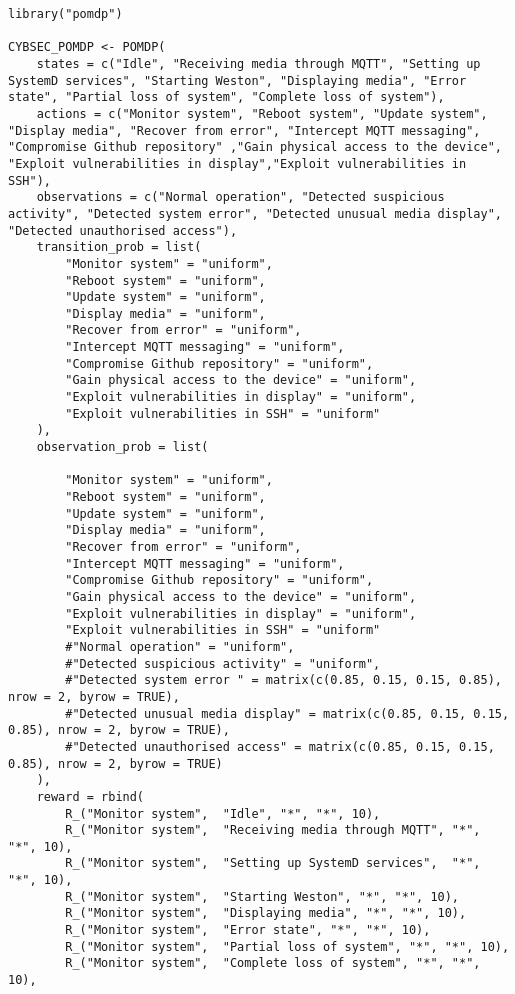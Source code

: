 \documentclass[language=english,version=final,mainfont=none,sharelatex=false]{utuftthesis}
\begin{document}
\begin{verbatim}
library("pomdp")

CYBSEC_POMDP <- POMDP(
    states = c("Idle", "Receiving media through MQTT", "Setting up SystemD services", "Starting Weston", "Displaying media", "Error state", "Partial loss of system", "Complete loss of system"),
    actions = c("Monitor system", "Reboot system", "Update system", "Display media", "Recover from error", "Intercept MQTT messaging", "Compromise Github repository" ,"Gain physical access to the device", "Exploit vulnerabilities in display","Exploit vulnerabilities in SSH"),
    observations = c("Normal operation", "Detected suspicious activity", "Detected system error", "Detected unusual media display", "Detected unauthorised access"),
    transition_prob = list(
        "Monitor system" = "uniform",
        "Reboot system" = "uniform",
        "Update system" = "uniform",
        "Display media" = "uniform",
        "Recover from error" = "uniform",
        "Intercept MQTT messaging" = "uniform",
        "Compromise Github repository" = "uniform",
        "Gain physical access to the device" = "uniform",
        "Exploit vulnerabilities in display" = "uniform",
        "Exploit vulnerabilities in SSH" = "uniform"
    ),
    observation_prob = list(

        "Monitor system" = "uniform",
        "Reboot system" = "uniform",
        "Update system" = "uniform",
        "Display media" = "uniform",
        "Recover from error" = "uniform",
        "Intercept MQTT messaging" = "uniform",
        "Compromise Github repository" = "uniform",
        "Gain physical access to the device" = "uniform",
        "Exploit vulnerabilities in display" = "uniform",
        "Exploit vulnerabilities in SSH" = "uniform"
        #"Normal operation" = "uniform",
        #"Detected suspicious activity" = "uniform",
        #"Detected system error " = matrix(c(0.85, 0.15, 0.15, 0.85), nrow = 2, byrow = TRUE),
        #"Detected unusual media display" = matrix(c(0.85, 0.15, 0.15, 0.85), nrow = 2, byrow = TRUE),
        #"Detected unauthorised access" = matrix(c(0.85, 0.15, 0.15, 0.85), nrow = 2, byrow = TRUE)
    ),
    reward = rbind(
        R_("Monitor system",  "Idle", "*", "*", 10),
        R_("Monitor system",  "Receiving media through MQTT", "*", "*", 10),
        R_("Monitor system",  "Setting up SystemD services",  "*", "*", 10),
        R_("Monitor system",  "Starting Weston", "*", "*", 10),
        R_("Monitor system",  "Displaying media", "*", "*", 10),
        R_("Monitor system",  "Error state", "*", "*", 10),
        R_("Monitor system",  "Partial loss of system", "*", "*", 10),
        R_("Monitor system",  "Complete loss of system", "*", "*", 10),


\end{verbatim}
\end{document}
